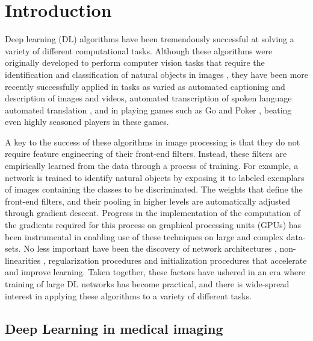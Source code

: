 \section{Introduction}\label{sec:intro}

Deep learning (DL) algorithms \citep{LeCun2015-js} have been tremendously
successful at solving a variety of different computational tasks. Although these
algorithms were originally developed to perform computer vision tasks that
require the identification and classification of natural objects in images
\citep{Krizhevsky2012-az}, they have been more recently successfully applied in
tasks as varied as automated captioning and description of images and
videos\citep{Karpathy2014-nx, Donahue2014-uq}, automated transcription of spoken
language \citep{Hannun2014-uj} automated translation \citep{Wu2016-kx}, and in
playing games such as Go \citep{Silver2016-uv} and Poker \citep{Hsu2017-cr},
beating even highly seasoned players in these games.

A key to the success of these algorithms in image processing is that they do not
require feature engineering of their front-end filters. Instead, these filters
are empirically learned from the data through a process of training. For
example, a network is trained to identify natural objects by exposing it to
labeled exemplars of images containing the classes to be discriminated. The
weights that define the front-end filters, and their pooling in higher levels
are automatically adjusted through gradient descent. Progress in the
implementation of the computation of the gradients required for this process on
graphical processing units (GPUs) has been instrumental in enabling use of these
techniques on large and complex data-sets. No less important have been the
discovery of network architectures \citep{Canziani2016-ps}, non-linearities
\citep{Glorot2011-hk}, regularization procedures \citep{Hinton2012-fm} and
initialization procedures \citep{Glorot2010-is} that accelerate and improve
learning. Taken together, these factors have ushered in an era where training of
large DL networks has become practical, and there is wide-spread interest in
applying these algorithms to a variety of different tasks.

\subsection{Deep Learning in medical imaging}

